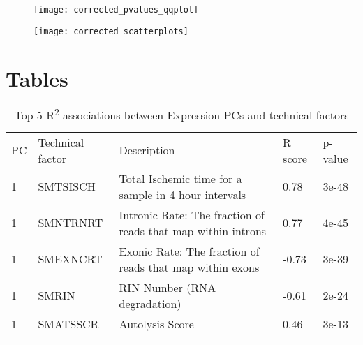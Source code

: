 \documentclass[graybox]{svmult}
\begin{document}
\begin{figure}[H]
\centering
\texttt{[image: corrected\_pvalues\_qqplot]}
\caption{}
\label{fig:corrected_pvalues_qqplot}
\end{figure}

\begin{figure}[H]
\centering
\texttt{[image: corrected\_scatterplots]}
\caption{}
\label{fig:corrected_scatterplots}
\end{figure}

\section{Tables}

\begin{table}[H]
\caption{Top 5 R\textsuperscript{2} associations between Expression PCs and technical factors}
\label{tab:expression_pcs_and_tfs}       %
%

\begin{tabular}{p{1cm}p{2.4cm}p{11cm}p{1cm}p{1cm}}
\hline\noalign{\smallskip}
 PC & Technical factor & Description & R score & p-value  \\
\noalign{\smallskip}\svhline\noalign{\smallskip}
1 & SMTSISCH & Total Ischemic time for a sample in 4 hour intervals & 0.78 & 3e-48\\
1 & SMNTRNRT & Intronic Rate: The fraction of reads that map within introns & 0.77 & 4e-45\\
1 & SMEXNCRT & Exonic Rate: The fraction of reads that map within exons & -0.73 & 3e-39 \\
1 & SMRIN & RIN Number (RNA degradation) & -0.61 & 2e-24 \\
1 & SMATSSCR & Autolysis Score & 0.46 & 3e-13 \\
\noalign{\smallskip}\hline\noalign{\smallskip}
\end{tabular}
\end{table}
\end{document}
